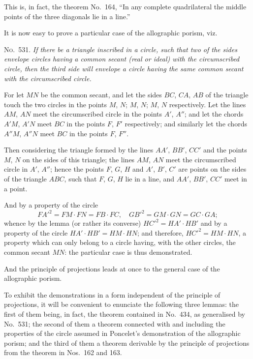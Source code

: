 \documentclass[11pt,a4paper]{book}
\begin{document}
This is, in fact, the theorem No.~164, ``In any complete quadrilateral the middle points of the three diagonals lie in a line.''

It is now easy to prove a particular case of the allographic porism, viz.

\textsc{No.~531.} \textit{If there be a triangle inscribed in a circle, such that two of the sides envelope circles having a common secant (real or ideal) with the circumscribed circle, then the third side will envelope a circle having the same common secant with the circumscribed circle.}

For let $MN$ be the common secant, and let the sides $BC$, $CA$, $AB$ of the triangle touch the two circles in the points $M$, $N$; $M$, $N$; $M$, $N$ respectively. Let the lines $AM$, $AN$ meet the circumscribed circle in the points $A'$, $A''$; and let the chords $A'M$, $A'N$ meet $BC$ in the points $F$, $F'$ respectively; and similarly let the chords $A''M$, $A''N$ meet $BC$ in the points $F$, $F''$.

Then considering the triangle formed by the lines $AA'$, $BB'$, $CC'$ and the points $M$, $N$ on the sides of this triangle; the lines $AM$, $AN$ meet the circumscribed circle in $A'$, $A''$; hence the points $F$, $G$, $H$ and $A'$, $B'$, $C'$ are points on the sides of the triangle $ABC$, such that $F$, $G$, $H$ lie in a line, and $AA'$, $BB'$, $CC'$ meet in a point.

And by a property of the circle
\[
FA'^2 = FM \cdot FN = FB \cdot FC, \quad GB'^2 = GM \cdot GN = GC \cdot GA;
\]
whence by the lemma (or rather its converse) $HC'^2 = HA' \cdot HB'$ and by a property of the circle $HA' \cdot HB' = HM \cdot HN$; and therefore, $HC'^2 = HM \cdot HN$, a property which can only belong to a circle having, with the other circles, the common secant $MN$: the particular case is thus demonstrated.

And the principle of projections leads at once to the general case of the allographic porism.

To exhibit the demonstrations in a form independent of the principle of projections, it will be convenient to enunciate the following three lemmas: the first of them being, in fact, the theorem contained in No.~434, as generalised by No.~531; the second of them a theorem connected with and including the properties of the circle assumed in Poncelet's demonstration of the allographic porism; and the third of them a theorem derivable by the principle of projections from the theorem in Nos.~162 and 163.
\end{document}
